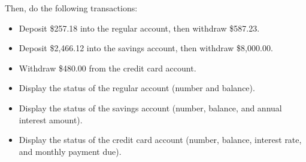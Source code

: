 \begin{exercise}
Then, do the following transactions:

\begin{itemize}
\item Deposit \$257.18 into the regular account, then withdraw \$587.23.
\item Deposit \$2,466.12 into the savings account, then withdraw \$8,000.00.
\item Withdraw \$480.00 from the credit card account.
\item Display the status of the regular account (number and balance).
\item Display the status of the savings account (number, balance, and annual interest amount).
\item Display the status of the credit card account (number, balance, interest rate, and monthly payment due).
\end{itemize}


\end{exercise}
